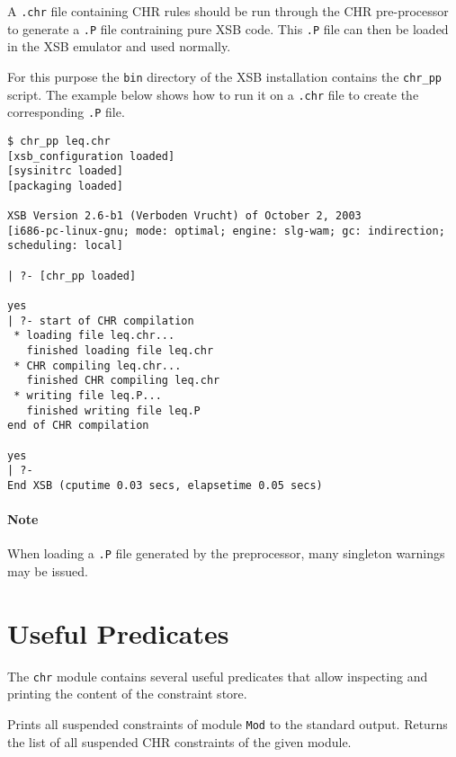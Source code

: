 A \texttt{.chr} file containing CHR rules should be run through the CHR pre-processor
to generate a \texttt{.P} file contraining pure XSB code. This \texttt{.P} file can then be
loaded in the XSB emulator and used normally.

For this purpose the \texttt{bin} directory of the XSB installation contains
the \texttt{chr\_pp} script. The example below shows how to run it on a
\texttt{.chr} file to create the corresponding \texttt{.P} file.

\begin{verbatim}
$ chr_pp leq.chr
[xsb_configuration loaded]
[sysinitrc loaded]
[packaging loaded]

XSB Version 2.6-b1 (Verboden Vrucht) of October 2, 2003
[i686-pc-linux-gnu; mode: optimal; engine: slg-wam; gc: indirection; scheduling: local]

| ?- [chr_pp loaded]

yes
| ?- start of CHR compilation
 * loading file leq.chr...
   finished loading file leq.chr
 * CHR compiling leq.chr...
   finished CHR compiling leq.chr
 * writing file leq.P...
   finished writing file leq.P
end of CHR compilation

yes
| ?-
End XSB (cputime 0.03 secs, elapsetime 0.05 secs)
\end{verbatim}

\paragraph{Note}

When loading a \texttt{.P} file generated by the preprocessor, many singleton
warnings may be issued.


\section{Useful Predicates} \label{predicates}

The \texttt{chr} module contains several useful predicates that allow
inspecting and printing the content of the constraint store.

\begin{description}
  Prints all suspended constraints of module \texttt{Mod} to
  the standard output.
  Returns the list of all suspended CHR constraints of the given module.
\end{description}

